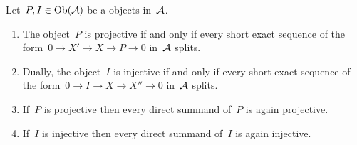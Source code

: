 \begin{lemma}
  Let~$P, I \in \operatorname{Ob}(\mathcal{A})$ be a objects in~$\mathcal{A}$.
  \begin{enumerate}
    \item
      \label{ses ending in projective}
      The object~$P$ is projective if and only if every short exact sequence of the form~$0 \to X' \to X \to P \to 0$ in~$\mathcal{A}$ splits.
    \item
      Dually, the object~$I$ is injective if and only if every short exact sequence of the form~$0 \to I \to X \to X'' \to 0$ in~$\mathcal{A}$ splits.
    \item
      \label{direct summand of projective}
      If~$P$ is projective then every direct summand of~$P$ is again projective.
    \item
      If~$I$ is injective then every direct summand of~$I$ is again injective.
  \end{enumerate}
\end{lemma}


